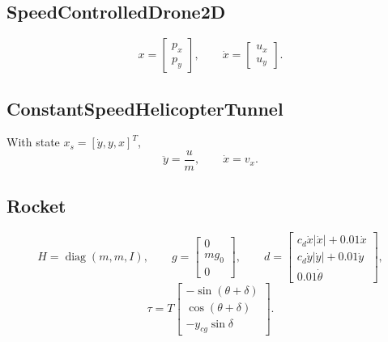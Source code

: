 \documentclass[11pt]{article}
\newcommand{\diag}{\operatorname{diag}}
\begin{document}
\subsection{SpeedControlledDrone2D}
\begin{equation}
    x=\begin{bmatrix}p_x\\p_y\end{bmatrix},
    \qquad
    \dot x=\begin{bmatrix}u_x\\u_y\end{bmatrix}.
\end{equation}

\subsection{ConstantSpeedHelicopterTunnel}
With state \(x_s=[\dot y,y,x]^T\),
\begin{equation}
    \ddot y = \frac{u}{m},
    \qquad
    \dot x=v_x.
\end{equation}

\subsection{Rocket}
\begin{equation}
    H=\diag(m,m,I),
    \qquad
    g=\begin{bmatrix}0\\mg_0\\0\end{bmatrix},
    \qquad
    d=
    \begin{bmatrix}
        c_d\dot x|\dot x|+0.01\dot x\\
        c_d\dot y|\dot y|+0.01\dot y\\
        0.01\dot\theta
    \end{bmatrix},
\end{equation}
\begin{equation}
    \tau =
    T
    \begin{bmatrix}
        -\sin(\theta+\delta)\\
        \cos(\theta+\delta)\\
        -y_{cg}\sin\delta
    \end{bmatrix}.
\end{equation}
\end{document}

